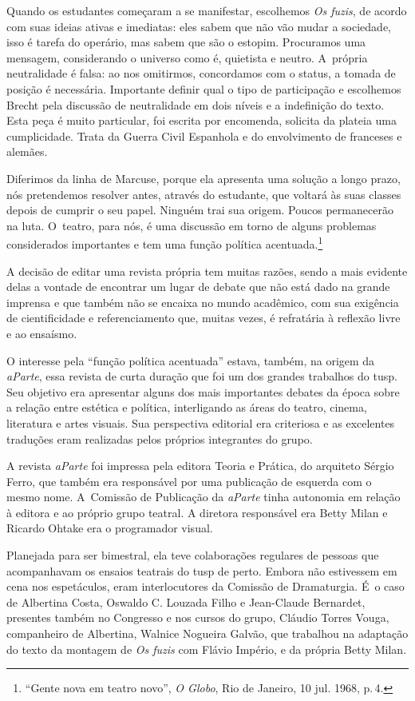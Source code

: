 Quando os estudantes começaram a se manifestar, escolhemos {\it Os
fuzis}, de acordo com suas ideias ativas e imediatas: eles sabem que não
vão mudar a sociedade, isso é tarefa do operário, mas sabem que são o
estopim. Procuramos uma mensagem, considerando o universo como é,
quietista e neutro. A~própria neutralidade é falsa: ao nos omitirmos,
concordamos com o status, a tomada de posição é necessária. Importante
definir qual o tipo de participação e escolhemos Brecht pela discussão
de neutralidade em dois níveis e a indefinição do texto. Esta peça é
muito particular, foi escrita por encomenda, solicita da plateia uma
cumplicidade. Trata da Guerra Civil Espanhola e do envolvimento de
franceses e alemães.

Diferimos da linha de Marcuse, porque ela apresenta uma solução a longo
prazo, nós pretendemos resolver antes, através do estudante, que voltará
às suas classes depois de cumprir o seu papel. Ninguém trai sua origem.
Poucos permanecerão na luta. O~teatro, para nós, é uma discussão em
torno de alguns problemas considerados importantes e tem uma função
política acentuada.\footnote{“Gente nova em teatro novo”, {\it O
  Globo}, Rio de Janeiro, 10 jul. 1968, p.\,4.}
\stopblockquote

A decisão de editar uma revista própria tem muitas razões, sendo a mais
evidente delas a vontade de encontrar um lugar de debate que não está
dado na grande imprensa e que também não se encaixa no mundo acadêmico,
com sua exigência de cientificidade e referenciamento que, muitas vezes, é
refratária à reflexão livre e ao ensaísmo.

O interesse pela “função política acentuada” estava, também, na origem
da {\it aParte}, essa revista de curta duração que foi um dos grandes
trabalhos do {\sc tusp}. Seu objetivo era apresentar alguns dos mais
importantes debates da época sobre a relação entre estética e política,
interligando as áreas do teatro, cinema, literatura e artes visuais. Sua
perspectiva editorial era criteriosa e as excelentes traduções eram
realizadas pelos próprios integrantes do grupo.

A revista {\it aParte} foi impressa pela editora Teoria e Prática, do
arquiteto Sérgio Ferro, que também era responsável por uma publicação de
esquerda com o mesmo nome. A~Comissão de Publicação da {\it aParte}
tinha autonomia em relação à editora e ao próprio grupo teatral. A
diretora responsável era Betty Milan e Ricardo
Ohtake era o programador visual.

Planejada para ser bimestral, ela teve colaborações regulares de pessoas
que acompanhavam os ensaios teatrais do {\sc tusp} de perto. Embora não
estivessem em cena nos espetáculos, eram interlocutores da Comissão de
Dramaturgia. É~o caso de Albertina Costa, Oswaldo C. Louzada Filho e
Jean-Claude Bernardet, presentes também no Congresso e nos cursos do
grupo, Cláudio Torres Vouga, companheiro de Albertina, Walnice Nogueira
Galvão, que trabalhou na adaptação do texto da montagem de {\it Os
fuzis} com Flávio Império, e da própria Betty Milan.

